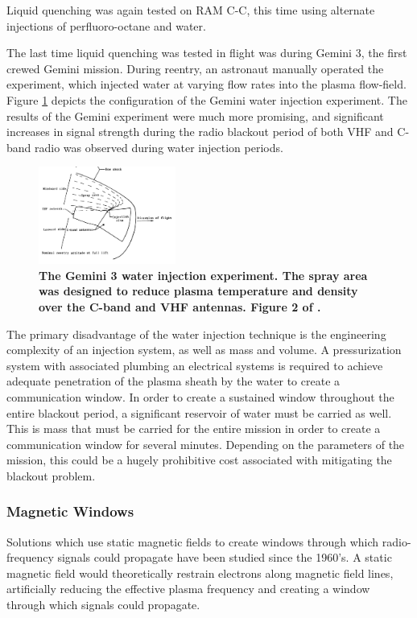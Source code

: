 \documentclass[twocolumn]{article}
\begin{document}
			Liquid quenching was again tested on RAM C-C, this time using alternate injections of perfluoro-octane and water.\cite{rybak_causes_1970}
			
			The last time liquid quenching was tested in flight was during Gemini 3, the first crewed Gemini mission.\cite{schroeder_flight_1968}
			During reentry, an astronaut manually operated the experiment, which injected water at varying flow rates into the plasma flow-field.
			Figure \ref{fig:GeminiWaterDiagram} depicts the configuration of the Gemini water injection experiment.
			The results of the Gemini experiment were much more promising, and significant increases in signal strength during the radio blackout period of both VHF and C-band radio was observed during water injection periods.\cite{schroeder_flight_1968}
			\begin{figure}
				\centering
				\includegraphics[width=0.4\textwidth]{Images/GeminiWaterDiagram}
				\caption[Diagram of the Gemini 3 water injection experiment.]{\textbf{The Gemini 3 water injection experiment. The spray area was designed to reduce plasma temperature and density over the C-band and VHF antennas. Figure 2 of \cite{schroeder_flight_1968}.}}
				\label{fig:GeminiWaterDiagram}
			\end{figure}
			
			The primary disadvantage of the water injection technique is the engineering complexity of an injection system, as well as mass and volume.
			A pressurization system with associated plumbing an electrical systems is required to achieve adequate penetration of the plasma sheath by the water to create a communication window.
			In order to create a sustained window throughout the entire blackout period, a significant reservoir of water must be carried as well.
			This is mass that must be carried for the entire mission in order to create a communication window for several minutes.
			Depending on the parameters of the mission, this could be a hugely prohibitive cost associated with mitigating the blackout problem.
		
		\subsubsection*{Magnetic Windows}
			Solutions which use static magnetic fields to create windows through which radio-frequency signals could propagate have been studied since the 1960's.\cite{russo_measurements_1964}
			A static magnetic field would theoretically restrain electrons along magnetic field lines, artificially reducing the effective plasma frequency and creating a window through which signals could propagate.\cite{kim_electromagnetic_2009}
			
\end{document}

